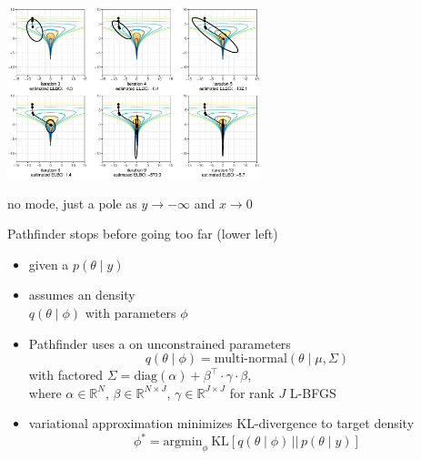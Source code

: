 \documentclass[9pt]{report}
\begin{document}
\vspace*{-6pt}
\begin{center}
\includegraphics[width=0.55\textwidth]{img/funnel_example.eps}
\end{center}
\begin{subitemize}
\item no mode, just a pole as $y \rightarrow -\infty$ and $x \rightarrow 0$
\item Pathfinder stops before going too far (lower left)
\end{subitemize}


\begin{itemize}
\item given a  $p(\theta \mid y)$
\item {} assumes an  density
  \\ $q(\theta \mid \phi)$ with parameters $\phi$
\item Pathfinder uses a  on unconstrained parameters
  \[
    q(\theta \mid \phi) = \textrm{multi-normal}(\theta \mid \mu, \Sigma)
  \]
  with factored $\Sigma = \textrm{diag}(\alpha) + \beta^{\top} \cdot \gamma \cdot \beta$,
  \\[2pt] where 
  $\alpha \in \mathbb{R}^N$, $\beta \in \mathbb{R}^{N \times J}$, $\gamma \in \mathbb{R}^{J \times J}$ for rank $J$ L-BFGS
\item variational approximation minimizes KL-divergence to target density
  \[
    \phi^*
    = \textrm{argmin}_{\phi} \
    \textrm{KL}\!\left[q(\theta \mid \phi) \,\bigg|\bigg|\, p(\theta \mid y)\right]
  \]
\end{itemize}
\end{document}
